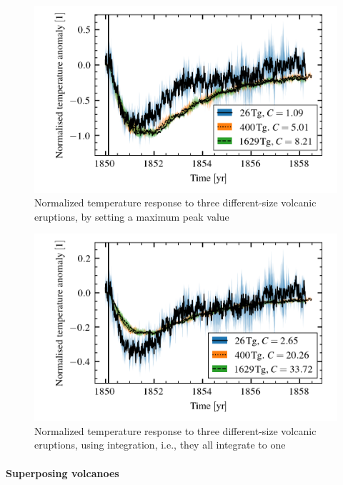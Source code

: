 \documentclass[twocol]{ametsocV5}
\begin{document}
\begin{figure}
  \begin{center}
    \includegraphics[width=0.95\linewidth]{figures/compare-waveform-max.png}
  \end{center}
  \caption{Normalized temperature response to three different-size volcanic eruptions,
    by setting a maximum peak value}%
  \label{fig:temp_norm_max}
\end{figure}

\begin{figure}
  \begin{center}
    \includegraphics[width=0.95\linewidth]{figures/compare-waveform-integrate.png}
  \end{center}
  \caption{Normalized temperature response to three different-size volcanic eruptions,
    using integration, i.e., they all integrate to one}%
  \label{fig:temp_norm_int}
\end{figure}

\paragraph{Superposing volcanoes}
\end{document}
